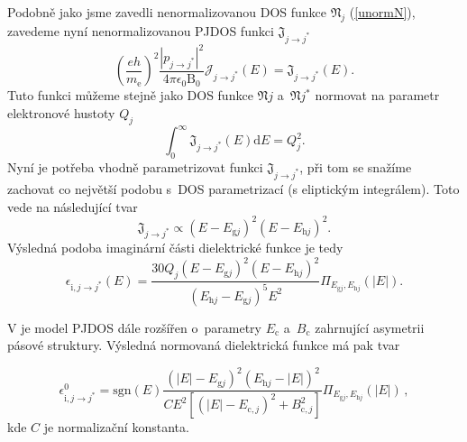 Podobně jako jsme zavedli nenormalizovanou DOS funkce $\mathfrak{N}_j$ (\ref{unormN}), zavedeme nyní nenormalizovanou PJDOS funkci $\mathfrak{J}_{j \rightarrow j^*}$
\begin{equation}
\left(\frac{eh}{m_\mathrm{e}} \right)^2 \frac{| p_{j \rightarrow j^*} |^2}{4 \pi \epsilon_0 \mathrm{B}_0} \mathcal{J}_{j \rightarrow j^*}(E)
= \mathfrak{J}_{j \rightarrow j^*}(E) \text{.}
\end{equation}
Tuto funkci můžeme stejně jako DOS funkce $\mathfrak{N}{j}$ a~$\mathfrak{N}{j}^*$ normovat na parametr elektronové hustoty $Q_j$
\begin{equation}
\int_0^\infty \mathfrak{J}_{j \rightarrow j^*}(E)\mathrm{d}E = Q_j^2 \text{.}
\end{equation}
Nyní je potřeba vhodně parametrizovat funkci $\mathfrak{J}_{j \rightarrow j^*}$, při tom se snažíme zachovat co největší podobu s~DOS parametrizací (s eliptickým integrálem). Toto vede na následující tvar
\begin{equation}
\mathfrak{J}_{j \rightarrow j^*} \propto (E - E_{\mathrm{g}j})^2 (E - E_{\mathrm{h}j})^2 \text{.}
\end{equation} 
Výsledná podoba imaginární části dielektrické funkce je tedy
\begin{equation}
\label{PJDOS1}
\epsilon_{\mathrm{i},j \rightarrow j^*}(E) = 
\frac{30Q_j (E - E_{\mathrm{g}j})^2 (E - E_{\mathrm{h}j})^2 }{(E_{\mathrm{h}j} - E_{\mathrm{g}j})^5 E^2 } 
\Pi_{E_{\mathrm{g}j},E_{\mathrm{h}j}}(|E|)
\text{.}
\end{equation}

V \cite{sumrule2} je model PJDOS dále rozšířen o~parametry $E_\mathrm{c}$ a~$B_\mathrm{c}$ zahrnující asymetrii pásové struktury. Výsledná normovaná dielektrická funkce má pak tvar

\begin{equation}
\label{valencvod}
\epsilon_{\mathrm{i},j \rightarrow j^*}^0 = 
\mathrm{sgn}(E) 
\frac	{(|E|- E_{\mathrm{g}j})^2(E_{\mathrm{h}j} - |E|)^2}
	{ C E^2 [(|E| - E_{\mathrm{c},j})^2 + B_{\mathrm{c},j}^2]} 
\Pi_{E_{\mathrm{g}j},E_{\mathrm{h}j}}(|E|) \, \mathrm{,}
\end{equation}
kde $C$ je normalizační konstanta.


